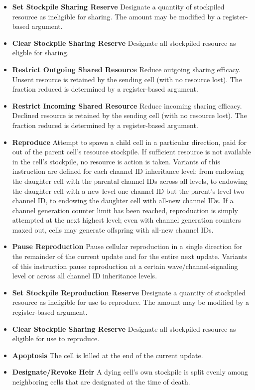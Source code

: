 \begin{itemize}
\item \textbf{Set Stockpile Sharing Reserve}
Designate a quantity of stockpiled resource as ineligible for sharing.
The amount may be modified by a register-based argument.
\item \textbf{Clear Stockpile Sharing Reserve}
Designate all stockpiled resource as eligble for sharing.
\item \textbf{Restrict Outgoing Shared Resource}
Reduce outgoing sharing efficacy.
Unsent resource is retained by the sending cell (with no resource lost).
The fraction reduced is determined by a register-based argument.
\item \textbf{Restrict Incoming Shared Resource}
Reduce incoming sharing efficacy.
Declined resource is retained by the sending cell (with no resource lost).
The fraction reduced is determined by a register-based argument.
\item \textbf{Reproduce}
Attempt to spawn a child cell in a particular direction, paid for out of the parent cell's resource stockpile.
If sufficient resource is not available in the cell's stockpile, no resource is action is taken.
Variants of this instruction are defined for each channel ID inheritance level: from endowing the daughter cell with the parental channel IDs across all levels, to endowing the daughter cell with a new level-one channel ID but the parent's level-two channel ID, to endowing the daughter cell with all-new channel IDs.
If a channel generation counter limit has been reached, reproduction is simply attempted at the next highest level; even with channel generation counters maxed out, cells may generate offspring with all-new channel IDs.
\item \textbf{Pause Reproduction}
Pause cellular reproduction in a single direction for the remainder of the current update and for the entire next update.
Variants of this instruction pause reproduction at a certain wave/channel-signaling level or across all channel ID inheritance levels.
\item \textbf{Set Stockpile Reproduction Reserve}
Designate a quantity of stockpiled resource as ineligible for use to reproduce.
The amount may be modified by a register-based argument.
\item \textbf{Clear Stockpile Sharing Reserve}
Designate all stockpiled resource as eligible for use to reproduce.
\item \textbf{Apoptosis}
The cell is killed at the end of the current update.
\item \textbf{Designate/Revoke Heir} A dying cell's own stockpile is split evenly among neighboring cells that are designated at the time of death.

\end{itemize}

